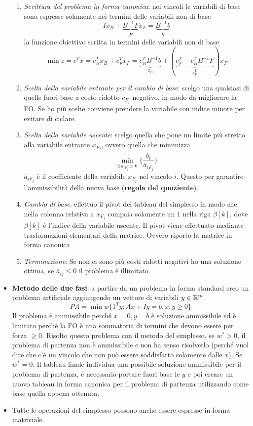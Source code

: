\begin{itemize}
	\begin{enumerate}
		\item \textit{Scrittura del problema in forma canonica}: nei vincoli le variabili di base sono espresse solamente nei termini delle variabili non di base
		$$
		Ix_B + \underbrace{B^{-1}F}_{\overline{F}}x_F = \underbrace{B^{-1}b}_{\overline{b}}
		$$
		la funzione obiettivo scritta in termini delle variabili non di base
		$$
		\min z = c^Tx = c_{B}^Tx_B + c_{F}^Tx_F = \underbrace{c_{B}^TB^{-1}b}_{z_B} + (\underbrace{c_{F}^T - c_{B}^TB^{-1}F}_{\overline{c}_{F}^T})x_F
		$$
		\item \textit{Scelta della variabile entrante per il cambio di base}: scelgo una qualsiasi di quelle fuori base a costo ridotto $\overline{c}_{F_{j}}$ negativo, in modo da migliorare la FO. Se ho più scelte conviene prendere la variabile con indice minore per evitare di ciclare.
		\item \textit{Scelta della variabile uscente}: scelgo quella che pone un limite più stretto alla variabile entrante $x_{F_j}$, ovvero quella che minimizza
		$$
		\min\limits_{i :\overline{a}_{iF_j} > 0} \bigg\{ \frac{\overline{b}_i}{\overline{a}_{iF_j}} \bigg\}
		$$
		$\overline{a}_{iF_j}$ è il coefficiente della variabile $x_{F_j}$ nel vincolo $i$. Questo per garantire l'ammissibilità della nuova base (\textbf{regola del quoziente}).
		\item \textit{Cambio di base}: effettuo il pivot del tableau del simplesso in modo che nella colonna relativa a $x_{F_j}$ compaia solamente un $1$ nella riga $\beta[k]$, dove $\beta[k]$ è l'indice della variabile uscente. Il pivot viene effettuato mediante trasformazioni elementari della matrice. Ovvero riporto la matrice in forma canonica
		\item \textit{Terminazione}: Se non ci sono più costi ridotti negativi ho una soluzione ottima, se $\overline{a}_{ij}\leq 0$ il problema è illimitato. 
	\end{enumerate}
	\item \textbf{Metodo delle due fasi}: a partire da un problema in forma standard creo un problema artificiale aggiungendo un vettore di variabili $y \in \mathbb{R}^m$.
	$$
	PA = \min w\{ 1^Ty : Ax+Iy=b, x,y\geq 0 \}
	$$
	Il problema è ammissibile perché $x = 0, y = b$ è soluzione ammissibile ed è limitato perché la FO è una sommatoria di termini che devono essere per forza $\geq 0$.
	Risolto questo problema con il metodo del simplesso, se $w^* > 0$, il problema di partenza non è ammissibile e non ha senso risolverlo (perché vuol dire che c'è un vincolo che non può essere soddisfatto solamente dalle $x$). Se $w^* = 0$. Il tableau finale individua una possibile soluzione ammissibile per il problema di partenza, è necessario portare fuori base le $y$ e poi creare un nuovo tableau in forma canonica per il problema di partenza utilizzando come base quella appena ottenuta.
	\item Tutte le operazioni del simplesso possono anche essere espresse in forma matriciale.
\end{itemize}



